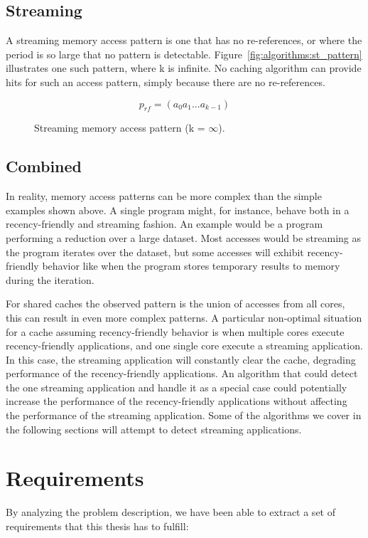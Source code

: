\subsection{Streaming}
A streaming memory access pattern is one that has no re-references, or where the period is so large that no pattern is detectable.
Figure~\ref{fig:algorithms:st_pattern} illustrates one such pattern, where k is infinite.
No caching algorithm can provide hits for such an access pattern, simply because there are no re-references.

\begin{figure}[ht]
\centering
\begin{equation} \label{fig:algorithms:st_pattern}
p_{rf} = (a_0 a_1 ... a_{k-1})
\end{equation}
\caption{Streaming memory access  pattern (k = $\infty$).}
\end{figure}

\subsection{Combined}
In reality, memory access patterns can be more complex than the simple examples shown above.
A single program might, for instance, behave both in a recency-friendly and streaming fashion. 
An example would be a program performing a reduction over a large dataset.
Most accesses would be streaming as the program iterates over the dataset, but some accesses will exhibit recency-friendly behavior like when the program stores temporary results to memory during the iteration.

For shared caches the observed pattern is the union of accesses from all cores, this can result in even more complex patterns.
A particular non-optimal situation for a cache assuming recency-friendly behavior is when multiple cores execute recency-friendly applications, and one single core execute a streaming application.
In this case, the streaming application will constantly clear the cache, degrading performance of the recency-friendly applications.
An algorithm that could detect the one streaming application and handle it as a special case could potentially increase the performance of the recency-friendly applications without affecting the performance of the streaming application.
Some of the algorithms we cover in the following sections will attempt to detect streaming applications.

\section{Requirements}
By analyzing the problem description, we have been able to extract a set of requirements that this thesis has to fulfill:

